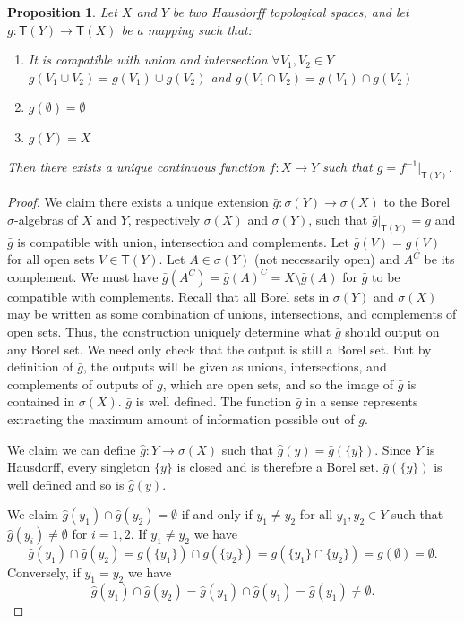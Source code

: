 \documentclass[review]{elsarticle}
\theoremstyle{plain}%
\newtheorem{prop}[thm]{Proposition}
\theoremstyle{definition}
\theoremstyle{remark}
\begin{document}
\begin{prop}
	\label{setfunctions}
	Let $X$ and $Y$ be two Hausdorff topological spaces, and let $g: \mathsf{T}(Y) \rightarrow \mathsf{T}(X)$ be a mapping such that:
	\begin{enumerate}
		\item It is compatible with union and intersection $\forall V_1, V_2 \in Y$ $g(V_1 \cup V_2)=g(V_1)\cup g(V_2)$ and $g(V_1 \cap V_2)=g(V_1)\cap g(V_2)$
		\item $g(\emptyset) = \emptyset$
		\item $g(Y) = X$
	\end{enumerate}
	Then there exists a unique continuous function $f: X \rightarrow Y$ such that $g = f^{-1} |_{\mathsf{T}(Y)}$.
\end{prop}

\begin{proof}
	We claim there exists a unique extension $\bar{g}:\sigma(Y)\to\sigma(X)$ to the Borel $\sigma$-algebras of $X$ and $Y$, respectively $\sigma(X)$ and $\sigma(Y)$, such that $\bar{g}|_{\mathsf{T}(Y)}=g$ and $\bar{g}$ is compatible with union, intersection and complements. Let $\bar{g}(V) = g(V)$ for all open sets $V \in \mathsf{T}(Y)$. Let $A \in \sigma(Y)$ (not necessarily open) and $A^C$ be its complement. We must have $\bar{g}(A^C) = \bar{g}(A)^C = X\setminus \bar{g}(A)$ for $\bar{g}$ to be compatible with complements. Recall that all Borel sets in $\sigma(Y)$ and $\sigma(X)$ may be written as some combination of unions, intersections, and complements of open sets. Thus, the construction uniquely determine what $\bar{g}$ should output on any Borel set. We need only check that the output is still a Borel set. But by definition of $\bar{g}$, the outputs will be given as unions, intersections, and complements of outputs of $g$, which are open sets, and so the image of $\bar{g}$ is contained in $\sigma(X)$.  $\bar{g}$ is well defined. The function $\bar{g}$ in a sense represents extracting the maximum amount of information possible out of $g$.
	
	We claim we can define $\hat{g}:Y\to\sigma(X)$ such that $\hat{g}(y) = \bar{g}(\{y\})$. Since $Y$ is Hausdorff, every singleton $\{y\}$ is closed and is therefore a Borel set. $\bar{g}(\{y\})$ is well defined and so is $\hat{g}(y)$.
	
	We claim  $\hat{g}(y_1)\cap\hat{g}(y_2) = \emptyset$ if and only if $y_1\neq y_2$ for all $y_1,y_2\in Y$ such that $\hat{g}(y_i)\neq\emptyset$ for $i=1,2$. If $y_1\neq y_2$ we have
	$$
	\hat{g}(y_1)\cap\hat{g}(y_2) = \bar{g}(\{y_1\})\cap\bar{g}(\{y_2\}) = \bar{g}(\{y_1\}\cap\{y_2\}) = \bar{g}(\emptyset) = \emptyset.
	$$
	Conversely, if $y_1 = y_2$ we have
	$$
	\hat{g}(y_1)\cap\hat{g}(y_2) = 	\hat{g}(y_1)\cap\hat{g}(y_1) = 
	\hat{g}(y_1) \neq \emptyset.
	$$
	

\end{proof}
\end{document}
